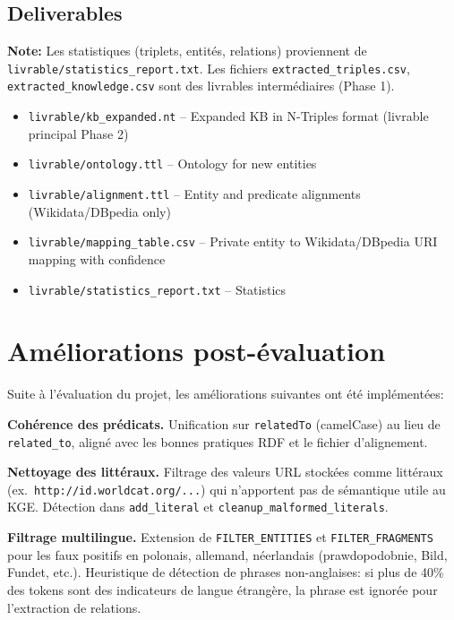 \documentclass[11pt,a4paper]{article}
\begin{document}
  \subsection{Deliverables}

  \textbf{Note:} Les statistiques (triplets, entités, relations) proviennent de \texttt{livrable/statistics\_report.txt}. Les fichiers \texttt{extracted\_triples.csv}, \texttt{extracted\_knowledge.csv} sont des livrables intermédiaires (Phase 1).

  \begin{itemize}
  \item \texttt{livrable/kb\_expanded.nt} -- Expanded KB in N-Triples format (livrable principal Phase 2)
  \item \texttt{livrable/ontology.ttl} -- Ontology for new entities
  \item \texttt{livrable/alignment.ttl} -- Entity and predicate alignments (Wikidata/DBpedia only)
  \item \texttt{livrable/mapping\_table.csv} -- Private entity to Wikidata/DBpedia URI mapping with confidence
  \item \texttt{livrable/statistics\_report.txt} -- Statistics
  \end{itemize}

  \section{Améliorations post-évaluation}

  Suite à l'évaluation du projet, les améliorations suivantes ont été implémentées:

  \textbf{Cohérence des prédicats.} Unification sur \texttt{relatedTo} (camelCase) au lieu de \texttt{related\_to}, aligné avec les bonnes pratiques RDF et le fichier d'alignement.

  \textbf{Nettoyage des littéraux.} Filtrage des valeurs URL stockées comme littéraux (ex.\ \texttt{http://id.worldcat.org/...}) qui n'apportent pas de sémantique utile au KGE. Détection dans \texttt{add\_literal} et \texttt{cleanup\_malformed\_literals}.

  \textbf{Filtrage multilingue.} Extension de \texttt{FILTER\_ENTITIES} et \texttt{FILTER\_FRAGMENTS} pour les faux positifs en polonais, allemand, néerlandais (prawdopodobnie, Bild, Fundet, etc.). Heuristique de détection de phrases non-anglaises: si plus de 40\% des tokens sont des indicateurs de langue étrangère, la phrase est ignorée pour l'extraction de relations.
\end{document}
